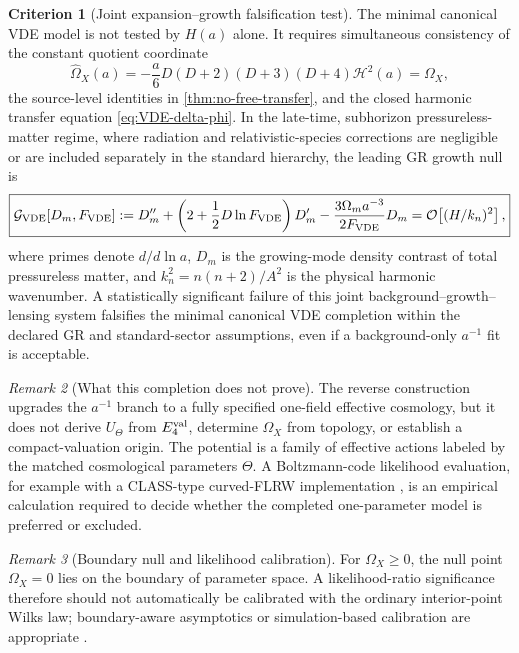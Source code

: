 \documentclass[11pt,a4paper]{article}
\def\dd{d}%
\def\Dil{D}%
\numberwithin{equation}{section}
\theoremstyle{definition}
\newtheorem{criterion}{Criterion}
\theoremstyle{plain}
\theoremstyle{remark}
\newtheorem{remark}[criterion]{Remark}
\newcommand{\Dil}{\mathscr{D}}
\newcommand{\Efour}{E_4}
\newcommand{\dd}{\mathrm{d}}
\begin{document}
\begin{criterion}[Joint expansion--growth falsification test]
The minimal canonical VDE model is not tested by $H(a)$ alone.  It requires
simultaneous consistency of the constant quotient coordinate
\begin{equation}
\widehat\Omega_X(a)=-\frac a6\Dil(\Dil+2)(\Dil+3)(\Dil+4)\mathcal H^2(a)
=\Omega_X,
\end{equation}
the source-level identities in \cref{thm:no-free-transfer}, and the closed
harmonic transfer equation \cref{eq:VDE-delta-phi}.  In the late-time,
subhorizon pressureless-matter regime, where radiation and relativistic-species
corrections are negligible or are included separately in the standard hierarchy,
the leading GR growth null is
\begin{equation}
\boxed{
\mathcal G_{\rm VDE}[D_m,F_{\rm VDE}]
:=D_m''+\left(2+\frac12\Dil\ln F_{\rm VDE}\right)D_m'
-\frac{3\Omega_ma^{-3}}{2F_{\rm VDE}}D_m
=\mathcal O\!\left[(H/k_n)^2\right],}
\end{equation}
where primes denote $\dd/\dd\ln a$, $D_m$ is the growing-mode density contrast
of total pressureless matter, and $k_n^2=n(n+2)/A^2$ is the physical harmonic
wavenumber.  A statistically significant failure of this joint
background--growth--lensing system falsifies the minimal canonical VDE
completion within the declared GR and standard-sector assumptions, even if a
background-only $a^{-1}$ fit is acceptable.
\end{criterion}

\begin{remark}[What this completion does not prove]
The reverse construction upgrades the $a^{-1}$ branch to a fully specified
one-field effective cosmology, but it does not derive $U_\Theta$ from
$\Efour^{\rm val}$, determine $\Omega_X$ from topology, or establish a
compact-valuation origin.  The potential is a family of effective actions
labeled by the matched cosmological parameters $\Theta$.  A Boltzmann-code
likelihood evaluation, for example with a CLASS-type curved-FLRW implementation
\cite{BlasLesgourguesTram2011,LesgourguesTram2014}, is an empirical calculation
required to decide whether the completed one-parameter model is preferred or
excluded.
\end{remark}


\begin{remark}[Boundary null and likelihood calibration]
For \(\Omega_X\ge0\), the null point \(\Omega_X=0\) lies on the boundary of parameter space. A likelihood-ratio significance therefore should not automatically be calibrated with the ordinary interior-point Wilks law; boundary-aware asymptotics or simulation-based calibration are appropriate \cite{Chernoff1954,SelfLiang1987}.
\end{remark}
\end{document}
